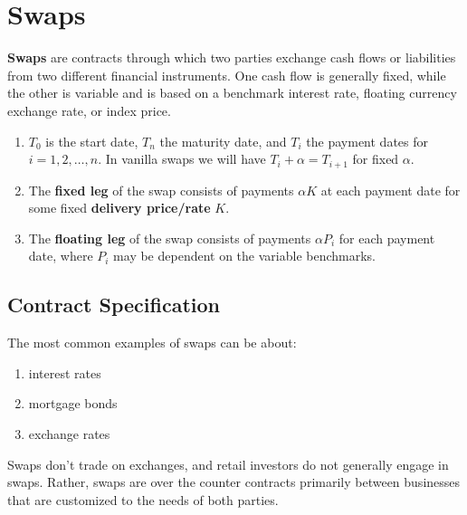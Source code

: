 \documentclass{article}
\begin{document}
\section{Swaps}

  \begin{definition}[Swap]
    \textbf{Swaps} are contracts through which two parties exchange cash flows or liabilities from two different financial instruments. One cash flow is generally fixed, while the other is variable and is based on a benchmark interest rate, floating currency exchange rate, or index price. 
    \begin{enumerate}
      \item $T_0$ is the start date, $T_n$ the maturity date, and $T_i$ the payment dates for $i = 1, 2, \ldots, n$. In vanilla swaps we will have $T_i + \alpha = T_{i+1}$ for fixed $\alpha$. 
      \item The \textbf{fixed leg} of the swap consists of payments $\alpha K$ at each payment date for some fixed \textbf{delivery price/rate} $K$. 
      \item The \textbf{floating leg} of the swap consists of payments $\alpha P_i$ for each payment date, where $P_i$ may be dependent on the variable benchmarks. 
    \end{enumerate}
  \end{definition}

  \subsection{Contract Specification} 

    The most common examples of swaps can be about: 
    \begin{enumerate}
      \item interest rates
      \item mortgage bonds 
      \item exchange rates
    \end{enumerate}
    Swaps don't trade on exchanges, and retail investors do not generally engage in swaps. Rather, swaps are over the counter contracts primarily between businesses that are customized to the needs of both parties. 
\end{document}
